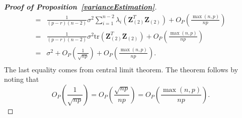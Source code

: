 \documentclass[review]{elsarticle}
\newcommand{\bZ}{\mathbf{Z}}
\theoremstyle{plain}
\theoremstyle{definition}
\theoremstyle{remark}
\begin{document}
\begin{proof}[\textbf{Proof of Proposition~\ref{varianceEstimation}}]
\begin{equation*}
\begin{aligned}
             =&
    \frac{1}{(p-r)(n-2)} \sigma^2\sum_{i=1}^{n-2}\lambda_{i}(\bZ_{(2)}^T \bZ_{(2)})
             +O_P(\frac{\max(n,p)}{np})\\
             =&
             \frac{1}{(p-r)(n-2)} \sigma^2\mathrm{tr}(\bZ_{(2)}^T \bZ_{(2)})
             +O_P(\frac{\max(n,p)}{np})\\
             =&
             \sigma^2
                +O_P(\frac{1}{\sqrt{np}})
             +O_P(\frac{\max(n,p)}{np}).\\
         \end{aligned}
     \end{equation*}
     The last equality comes from central limit theorem.
The theorem follows by noting that
$$
    O_{P}(\frac{1}{\sqrt{np}})=O_P(\frac{\sqrt{np}}{np})= O_P(\frac{\max (n,p)}{np}).
$$
\end{proof}
\end{document}
